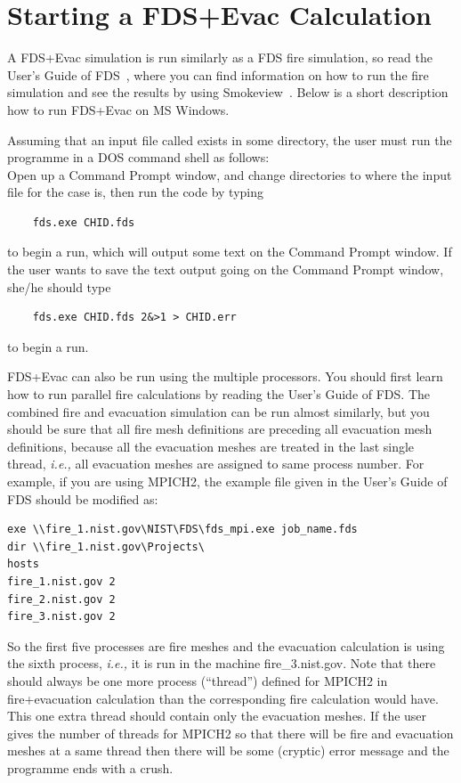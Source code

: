 \documentclass[12pt,a4paper,final,twoside]{stylevk}
\begin{document}
\section{Starting a FDS+Evac Calculation} 

\noindent A FDS+Evac simulation is run similarly as a FDS fire
simulation, so read the User's Guide of FDS~\cite{FDS_UserGuide},
where you can find information on how to run the fire simulation and
see the results by using Smokeview~\cite{SV_UserGuide}.  Below is a
short description how to run FDS+Evac on MS Windows.


Assuming that an input file called  exists in some
directory, the user must run the programme in a DOS command shell as
follows:\\
Open up a Command Prompt window, and change directories to where the
input file for the case is, then run the code by typing
\begin{verbatim}
    fds.exe CHID.fds
\end{verbatim}
to begin a run, which will output some text on the Command Prompt
window.  If the user wants to save the text output going on the
Command Prompt window, she/he should type
\begin{verbatim}
    fds.exe CHID.fds 2&>1 > CHID.err
\end{verbatim}
to begin a run.

FDS+Evac can also be run using the multiple processors.  You should
first learn how to run parallel fire calculations by reading the
User's Guide of FDS.  The combined fire and evacuation simulation can
be run almost similarly, but you should be sure that all fire mesh
definitions are preceding all evacuation mesh definitions, because all
the evacuation meshes are treated in the last single thread,
\emph{i.e.,} all evacuation meshes are assigned to same process
number.  For example, if you are using MPICH2, the example
 file given in the User's Guide of FDS should be
modified as:
\begin{verbatim}
exe \\fire_1.nist.gov\NIST\FDS\fds_mpi.exe job_name.fds
dir \\fire_1.nist.gov\Projects\
hosts
fire_1.nist.gov 2
fire_2.nist.gov 2
fire_3.nist.gov 2
\end{verbatim}
So the first five processes are fire meshes and the evacuation
calculation is using the sixth process, \emph{i.e.,} it is run in the
machine fire\_3.nist.gov.  Note that there should always be one more
process (``thread'') defined for MPICH2 in fire+evacuation calculation
than the corresponding fire calculation would have.  This one extra
thread should contain only the evacuation meshes.  If the user gives
the number of threads for MPICH2 so that there will be fire and
evacuation meshes at a same thread then there will be some (cryptic)
error message and the programme ends with a crush.
\end{document}
